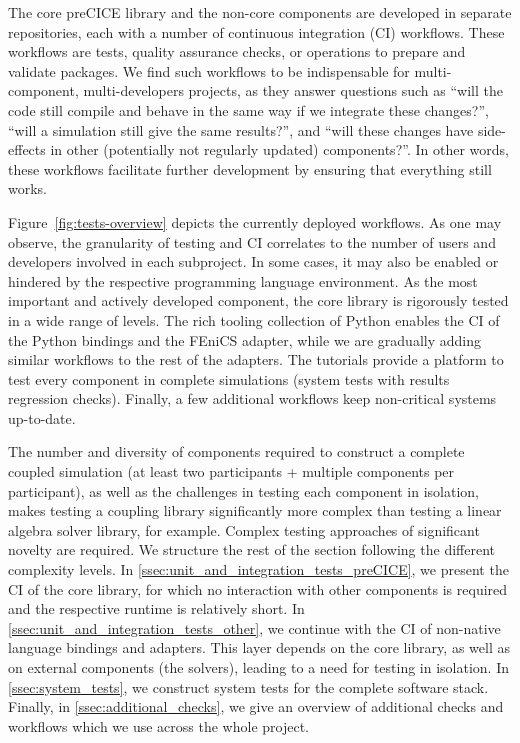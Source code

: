 The core preCICE library and the non-core components are developed in separate repositories,
each with a number of continuous integration (CI) workflows. These workflows are tests, quality assurance checks,
or operations to prepare and validate packages. We find such workflows to be indispensable for multi-component,
multi-developers projects, as they answer questions such as
``will the code still compile and behave in the same way if we integrate these changes?'',
``will a simulation still give the same results?'', and ``will these changes have side-effects in other (potentially not regularly updated) components?''.
In other words, these workflows facilitate further development by ensuring that everything still works.

Figure~\ref{fig:tests-overview} depicts the currently deployed workflows.
As one may observe, the granularity of testing and CI correlates to the
number of users and developers involved in each subproject.
In some cases, it may also be enabled or hindered by the respective programming language environment.
As the most important and actively developed component, the core library is rigorously tested in a wide range of levels.
The rich tooling collection of Python enables the CI of the Python bindings and the FEniCS adapter,
while we are gradually adding similar workflows to the rest of the adapters.
The tutorials provide a platform to test every component in complete simulations (system tests with results regression checks).
Finally, a few additional workflows keep non-critical systems up-to-date.

The number and diversity of components required to construct a complete coupled simulation
(at least two participants + multiple components per participant), as well as the challenges in
testing each component in isolation, makes testing a coupling library significantly more complex than testing a linear algebra solver library, for example.
Complex testing approaches of significant novelty are required.
We structure the rest of the section following the different complexity levels.
In \autoref{ssec:unit_and_integration_tests_preCICE}, we present the CI of the core library, for which
no interaction with other components is required and the respective runtime is relatively short.
In \autoref{ssec:unit_and_integration_tests_other}, we continue with the CI of non-native language bindings and adapters. This layer depends on
the core library, as well as on external components (the solvers), leading to a need for testing in isolation.
In \autoref{ssec:system_tests}, we construct system tests for the complete software stack.
Finally, in \autoref{ssec:additional_checks}, we give an overview of additional checks and workflows which we use across the whole project.

